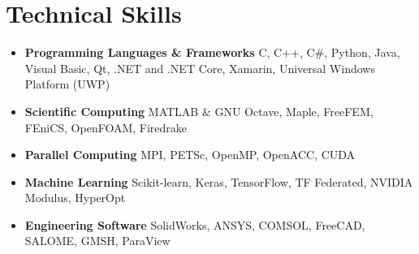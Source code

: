 \documentclass{cv}
\begin{document}
\section{Technical Skills}

\begin{itemize}[itemsep=-0.2ex]

\item
\textbf{Programming Languages \& Frameworks}  C, C++, C\#, Python, Java, Visual Basic, Qt, .NET and .NET Core, Xamarin, Universal Windows Platform (UWP)
\item
\textbf{Scientific Computing}  MATLAB \& GNU Octave, Maple, FreeFEM, FEniCS, OpenFOAM, Firedrake
\item 
\textbf{Parallel Computing} MPI, PETSc, OpenMP, OpenACC, CUDA
\item
\textbf{Machine Learning} Scikit-learn, Keras, TensorFlow, TF Federated, NVIDIA Modulus, HyperOpt
\item
\textbf{Engineering Software} SolidWorks, ANSYS, COMSOL, FreeCAD, SALOME, GMSH, ParaView

\end{itemize}
\end{document}
